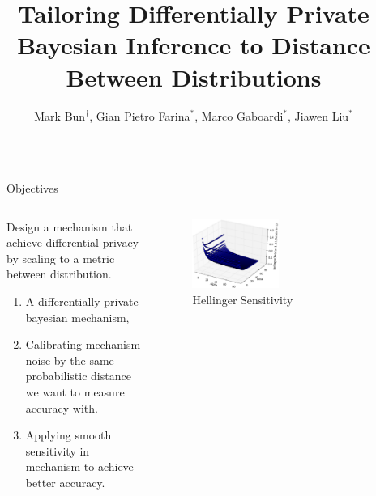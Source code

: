 \documentclass[final,hyperref={pdfpagelabels=false}]{beamer}
\title{\LARGE Tailoring Differentially Private Bayesian Inference to Distance Between Distributions} %
\author{Mark Bun$^\dag$,
Gian Pietro Farina$^{*}$,
Marco Gaboardi$^{*}$,
Jiawen Liu$^{*}$
}
\institute{$^\dag$Princeton University, $^{*}$University at Buffalo, SUNY} %
\begin{document}
\begin{frame}[t] %

\begin{columns}[t] %

\begin{column}{.015\textwidth}\end{column} %

\begin{column}{.485\textwidth} %


\begin{block}{Objectives}
\begin{columns} %
\begin{column}{.6\textwidth}
\noindent Design a mechanism that achieve differential privacy by scaling to a metric between distribution.
\begin{enumerate}
\item A differentially private bayesian mechanism,
\item Calibrating mechanism noise by the same probabilistic distance we want to measure accuracy with.
\item Applying smooth sensitivity in mechanism to achieve better accuracy.
\end{enumerate}
\end{column}
\begin{column}{.4\textwidth}
\begin{figure}[ht]
\centering
\includegraphics[width=0.5\textwidth]{poster_0.eps}
\caption{Hellinger Sensitivity}
\label{fig_sensitivity}
\end{figure}
\end{column}
\end{columns}


\end{block}
\end{column}
\end{columns}
\end{frame}
\end{document}

